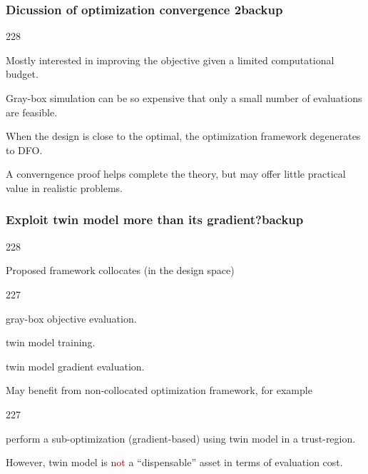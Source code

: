 \documentclass{beamer}
\newcommand{\barrow}{\item[\color{darkred}\ding{228}]}
\newcommand{\carrow}{\item[\color{darkred}\ding{227}]}
\begin{document}
\begin{frame}
    \frametitle{Dicussion of optimization convergence 2\hfill \scriptsize{backup}}\small
    \begin{dinglist}{228}
        \barrow Mostly interested in improving the objective given a limited computational budget.\vspace{.15cm}
        \barrow Gray-box simulation can be so expensive that only a small number of evaluations are feasible.\vspace{.15cm}
        \barrow When the design is close to the optimal, the optimization framework degenerates to DFO.\vspace{.15cm}
        \barrow A converngence proof helps complete the theory, but may offer little practical value in realistic problems.
    \end{dinglist}
\end{frame}

\begin{frame}
    \frametitle{Exploit twin model more than its gradient?\hfill \scriptsize{backup}}\small
    \begin{dinglist}{228}
        \barrow Proposed framework collocates (in the design space)
        \begin{dinglist}{227}
            \carrow gray-box objective evaluation.\vspace{.1cm}
            \carrow twin model training.\vspace{.1cm}
            \carrow twin model gradient evaluation.
        \end{dinglist}\vspace{.2cm}
        \barrow May benefit from non-collocated optimization framework, for example
        \begin{dinglist}{227}
            \carrow perform a sub-optimization (gradient-based) using twin model in a trust-region.
        \end{dinglist}\vspace{.2cm}
        \barrow However, 
            twin model is \textcolor{darkred}{not} a ``dispensable'' asset in terms of evaluation cost.
    \end{dinglist}
\end{frame}
\end{document}
